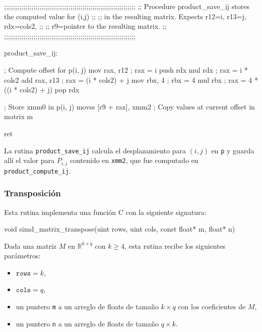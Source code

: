 \documentclass[a4paper, 10pt, twoside]{article}
\newcommand{\cc}[1]{\texttt{#1}}
\begin{document}
\begin{code}
  ;;;;;;;;;;;;;;;;;;;;;;;;;;;;;;;;;;;;;;;;;;;;;;;;;;;;;;;;;;;;;;;;;;;
  ;; Procedure product_save_ij stores the computed value for (i,j) ;;
  ;; in the resulting matrix. Expects r12=i, r13=j, rdx=cols2,     ;;
  ;; r9=pointer to the resulting matrix.                           ;;
  ;;;;;;;;;;;;;;;;;;;;;;;;;;;;;;;;;;;;;;;;;;;;;;;;;;;;;;;;;;;;;;;;;;;

  product_save_ij:

    ; Compute offset for p(i, j)
    mov rax, r12              ; rax = i
    push rdx
    mul rdx                   ; rax = i * cols2
    add rax, r13              ; rax = (i * cols2) + j
    mov rbx, 4                ; rbx = 4
    mul rbx                   ; rax = 4 * ((i * cols2) + j)
    pop rdx

    ; Store xmm0 in p(i, j)
    movss [r9 + rax], xmm2    ; Copy values at current offset in matrix m

    ret
\end{code}

La rutina \cc{product\_save\_ij} calcula el desplazamiento para $(i,j)$ en
\cc{p} y guarda allí el valor para $P_{i,j}$ contenido en \cc{xmm2}, que fue
computado en \cc{product\_compute\_ij}.


\subsubsection{Transposición}

Esta rutina implementa una función C con la siguiente signatura:

\begin{code}
  void simd_matrix_transpose(uint rows,
                             uint cols,
                             const float* m,
                             float* n)
\end{code}

Dada una matriz $M$ en $\mathbb{R}^{k \times q}$ con $k \geq 4$, esta rutina
recibe los siguientes parámetros:

\begin{itemize}
  \item $\cc{rows} = k$,
  \item $\cc{cols} = q$,
  \item un puntero \cc{m} a un arreglo de floats de tamaño $k \times q$ con los
    coeficientes de $M$,
  \item un puntero \cc{n} a un arreglo de floats de tamaño $q \times k$.
\end{itemize}
\end{document}
